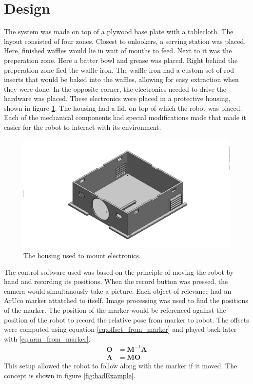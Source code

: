 \section{Design}
The system was made on top of a plywood base plate with a tablecloth. The layout consisted of four zones. Closest to onlookers, a serving station was placed. Here, finished waffles would lie in wait of mouths to feed. Next to it was the preperation zone. Here a batter bowl and grease was placed. Right behind the preperation zone lied the waffle iron. The waffle iron had a custom set of rod inserts that would be baked into the waffles, allowing for easy extraction when they were done. In the opposite corner, the electronics needed to drive the hardware was placed. These electronics were placed in a protective housing, shown in figure \ref{fig:mechanical}. The housing had a lid, on top of which the robot was placed. Each of the mechanical components had special modifications made that made it easier for the robot to interact with its environment.
\vskip1cm
\begin{figure}[h]
    \centering
    \includegraphics[width= 1\linewidth]{figures/boxv3.png}
    \caption{The housing used to mount electronics.}
    \label{fig:mechanical}
\end{figure}
The control software used was based on the principle of moving the robot by hand and recording its positions. When the record button was pressed, the camera would simultanously take a picture. Each object of relevance had an ArUco marker attatched to itself. Image processing was used to find the positions of the marker. The position of the marker would be referenced against the position of the robot to record the relative pose from marker to robot. The offsets were computed using equation \eqref{eq:offset_from_marker} and played back later with \eqref{eq:arm_from_marker}.
\begin{align}
    \mathbf{O} &= \mathbf{M}^{-1}\mathbf{A}\label{eq:offset_from_marker}\\
    \mathbf{A} &= \mathbf{M}\mathbf{O} \label{eq:arm_from_marker}
\end{align}
 This setup allowed the robot to follow along with the marker if it moved.  The concept is shown in figure \ref{fig:badExample}. 

